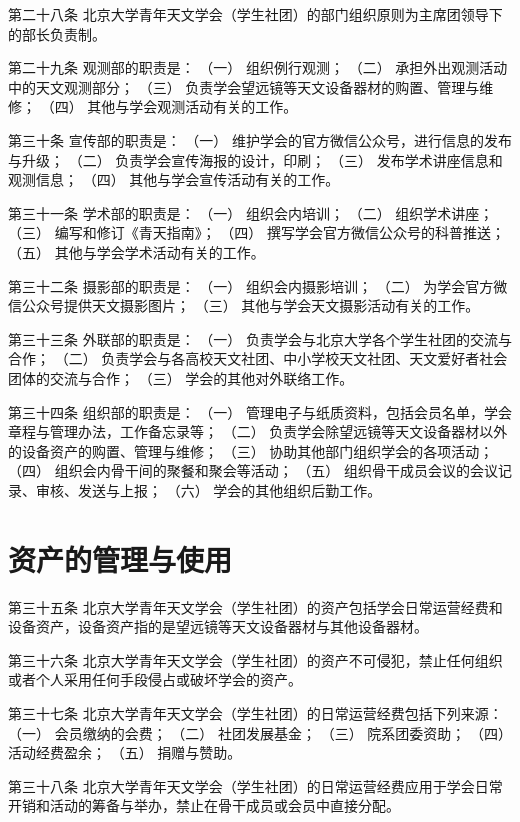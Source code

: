 第二十八条  北京大学青年天文学会（学生社团）的部门组织原则为主席团领导下的部长负责制。

第二十九条  观测部的职责是：
（一）  组织例行观测；
（二）  承担外出观测活动中的天文观测部分；
（三）  负责学会望远镜等天文设备器材的购置、管理与维修；
（四）  其他与学会观测活动有关的工作。

第三十条  宣传部的职责是：
（一）  维护学会的官方微信公众号，进行信息的发布与升级；
（二）  负责学会宣传海报的设计，印刷；
（三）  发布学术讲座信息和观测信息；
（四）  其他与学会宣传活动有关的工作。

第三十一条  学术部的职责是：
（一）  组织会内培训；
（二）  组织学术讲座；
（三）  编写和修订《青天指南》；
（四）  撰写学会官方微信公众号的科普推送；
（五）  其他与学会学术活动有关的工作。

第三十二条  摄影部的职责是：
（一）  组织会内摄影培训；
（二）  为学会官方微信公众号提供天文摄影图片；
（三）  其他与学会天文摄影活动有关的工作。

第三十三条  外联部的职责是：
（一）  负责学会与北京大学各个学生社团的交流与合作；
（二）  负责学会与各高校天文社团、中小学校天文社团、天文爱好者社会团体的交流与合作；
（三）  学会的其他对外联络工作。

第三十四条  组织部的职责是：
（一）  管理电子与纸质资料，包括会员名单，学会章程与管理办法，工作备忘录等；
（二）  负责学会除望远镜等天文设备器材以外的设备资产的购置、管理与维修；
（三）  协助其他部门组织学会的各项活动；
（四）  组织会内骨干间的聚餐和聚会等活动；
（五）  组织骨干成员会议的会议记录、审核、发送与上报；
（六）  学会的其他组织后勤工作。

\section{资产的管理与使用}

第三十五条  北京大学青年天文学会（学生社团）的资产包括学会日常运营经费和设备资产，设备资产指的是望远镜等天文设备器材与其他设备器材。

第三十六条  北京大学青年天文学会（学生社团）的资产不可侵犯，禁止任何组织或者个人采用任何手段侵占或破坏学会的资产。

第三十七条  北京大学青年天文学会（学生社团）的日常运营经费包括下列来源：
（一）  会员缴纳的会费；
（二）  社团发展基金；
（三）  院系团委资助；
（四）  活动经费盈余；
（五）  捐赠与赞助。

第三十八条  北京大学青年天文学会（学生社团）的日常运营经费应用于学会日常开销和活动的筹备与举办，禁止在骨干成员或会员中直接分配。

